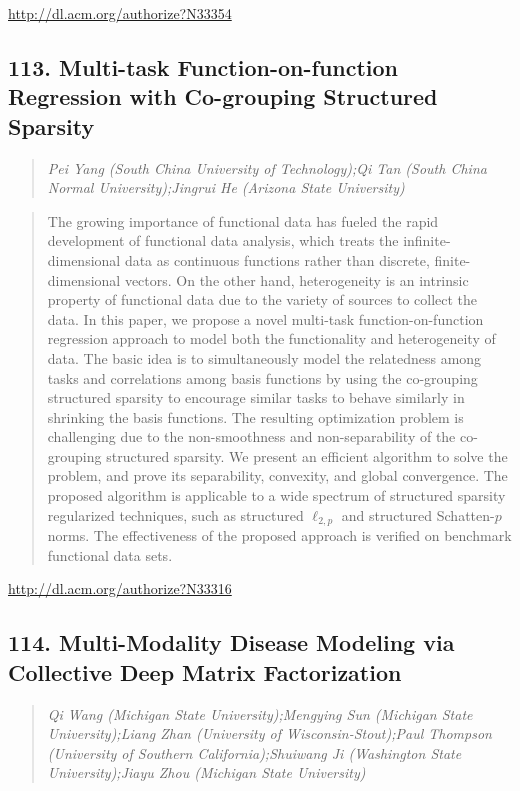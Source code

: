 \documentclass{article}
\begin{document}
\href{http://dl.acm.org/authorize?N33354}{http://dl.acm.org/authorize?N33354}

\subsection{113. Multi-task Function-on-function Regression with Co-grouping Structured Sparsity}

\begin{quote}
\footnotesize{\textit{Pei Yang (South China University of Technology);Qi Tan (South China Normal University);Jingrui He (Arizona State University)}}

\end{quote}

\begin{quote}
The growing importance of functional data has fueled the rapid development of functional data analysis, which treats the infinite-dimensional data as continuous functions rather than discrete, finite-dimensional vectors. On the other hand, heterogeneity is an intrinsic property of functional data due to the variety of sources to collect the data. In this paper, we propose a novel multi-task function-on-function regression approach to model both the functionality and heterogeneity of data. The basic idea is to simultaneously model the relatedness among tasks and correlations among basis functions by using the co-grouping structured sparsity to encourage similar tasks to behave similarly in shrinking the basis functions. The resulting optimization problem is challenging due to the non-smoothness and non-separability of the co-grouping structured sparsity. We present an efficient algorithm to solve the problem, and prove its separability, convexity, and global convergence. The proposed algorithm is applicable to a wide spectrum of structured sparsity regularized techniques, such as structured $\ell_{2,p}$ and structured Schatten-$p$ norms. The effectiveness of the proposed approach is verified on benchmark functional data sets.
\end{quote}

\href{http://dl.acm.org/authorize?N33316}{http://dl.acm.org/authorize?N33316}

\subsection{114. Multi-Modality Disease Modeling via Collective Deep Matrix Factorization}

\begin{quote}
\footnotesize{\textit{Qi Wang (Michigan State University);Mengying Sun (Michigan State University);Liang Zhan (University of Wisconsin-Stout);Paul Thompson (University of Southern California);Shuiwang Ji (Washington State University);Jiayu Zhou (Michigan State University)}}

\end{quote}
\end{document}
